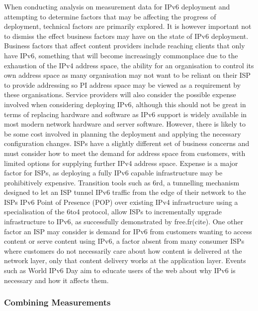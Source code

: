 When conducting analysis on measurement data for IPv6 deployment and attempting
to determine factors that may be affecting the progress of deployment, technical
factors are primarily explored. It is however important not to dismiss the
effect business factors may have on the state of IPv6 deployment. Business
factors that affect content providers include reaching clients that only have
IPv6, something that will become increasingly commonplace due to the exhaustion
of the IPv4 address space, the ability for an organisation to control its own
address space as many organisation may not want to be reliant on their ISP to
provide addressing so PI address space may be viewed as a requirement by these
organisations. Service providers will also consider the possible expense
involved when considering deploying IPv6, although this should not be great in
terms of replacing hardware and software as IPv6 support is widely available in
most modern network hardware and server software. However, there is likely to be
some cost involved in planning the deployment and applying the necessary
configuration changes. ISPs have a slightly different set of business concerns
and must consider how to meet the demand for address space from customers, with
limited options for supplying further IPv4 address space. Expense is a major
factor for ISPs, as deploying a fully IPv6 capable infrastructure may be
prohibitively expensive. Transition tools such as 6rd, a tunnelling mechanism
designed to let an ISP tunnel IPv6 traffic from the edge of their network to the
ISPs IPv6 Point of Presence (POP) over existing IPv4 infrastructure using a
specialisation of the 6to4 protocol, allow ISPs to incrementally upgrade
infrastructure to IPv6, as successfully demonstrated by free.fr(cite). One other
factor an ISP may consider is demand for IPv6 from customers wanting to access
content or serve content using IPv6, a factor absent from many consumer ISPs
where customers do not necessarily care about how content is delivered at the
network layer, only that content delivery works at the application layer. Events
such as World IPv6 Day aim to educate users of the web about why IPv6 is
necessary and how it affects them.

\subsubsection{Combining Measurements}

